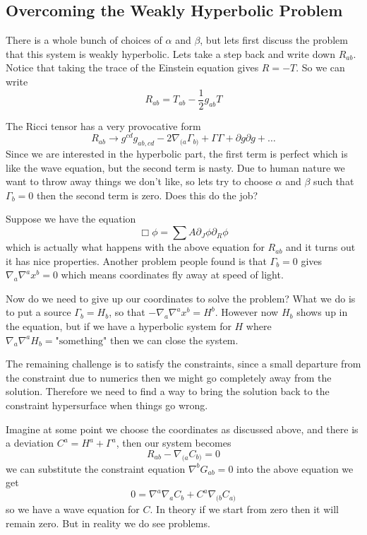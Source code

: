 \documentclass[letterpaper, 11pt]{article}
\numberwithin{equation}{section}
\numberwithin{figure}{section}
\begin{document}
\subsection{Overcoming the Weakly Hyperbolic Problem}

There is a whole bunch of choices of $\alpha$ and $\beta$, but lets first
discuss the problem that this system is weakly hyperbolic. Lets take a step back
and write down $R_{ab}$. Notice that taking the trace of the Einstein equation
gives $R = -T$. So we can write 
\begin{equation}
  \label{eq:27}
  R_{ab} = T_{ab} - \frac{1}{2}g_{ab}T
\end{equation}

The Ricci tensor has a very provocative form
\begin{equation}
  \label{eq:28}
  R_{ab} \longrightarrow g^{cd}g_{ab,cd} - 2\nabla_{(a}\Gamma_{b)} + \Gamma\Gamma + \partial g \partial g + \dots
\end{equation}
Since we are interested in the hyperbolic part, the first term is perfect
which is like the wave equation, but the second term is nasty. Due to human
nature we want to throw away things we don't like, so lets try to choose
$\alpha$ and $\beta$ such that $\Gamma_{b} = 0$ then the second term is zero.
Does this do the job?

Suppose we have the equation
\begin{equation}
  \label{eq:29}
  \Box \phi = \sum A \partial_{J}\phi \partial_R\phi
\end{equation}
which is actually what happens with the above equation for $R_{ab}$ and it turns
out it has nice properties. Another problem people found is that $\Gamma_{b} =
0$ gives $\nabla_a\nabla^{a}x^{b} = 0$ which means coordinates fly away at speed
of light.

Now do we need to give up our coordinates to solve the problem? What we do is
to put a source $\Gamma_{b} = H_{b}$, so that $-\nabla_{a}\nabla^{a}x^{b} =
H^{b}$. However now $H_{b}$ shows up in the equation, but if we have a
hyperbolic system for $H$ where $\nabla_a\nabla^{a}H_{b} = \text{"something"}$
then we can close the system.

The remaining challenge is to satisfy the constraints, since a small departure
from the constraint due to numerics then we might go completely away from the
solution. Therefore we need to find a way to bring the solution back to the
constraint hypersurface when things go wrong.

Imagine at some point we choose the coordinates as discussed above, and there is
a deviation $C^{a} = H^{a} + \Gamma^{a}$, then our system becomes
\begin{equation}
  \label{eq:30}
  R_{ab} - \nabla_{(a}C_{b)} = 0
\end{equation}
we can substitute the constraint equation $\nabla^{b}G_{ab} = 0$ into the above
equation we get
\begin{equation}
  \label{eq:31}
  0 = \nabla^{a}\nabla_{a}C_{b} + C^{a}\nabla_{(b}C_{a)}
\end{equation}
so we have a wave equation for $C$. In theory if we start from zero then it will
remain zero. But in reality we do see problems.
\end{document}
